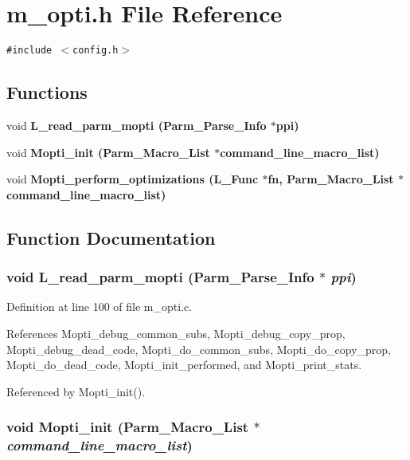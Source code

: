 \section{m\_\-opti.h File Reference}
\label{m__opti_8h}
{\tt \#include $<$config.h$>$}\par
\subsection*{Functions}
\begin{CompactItemize}
\item 
void \bf{L\_\-read\_\-parm\_\-mopti} (Parm\_\-Parse\_\-Info $\ast$ppi)
\item 
void \bf{Mopti\_\-init} (Parm\_\-Macro\_\-List $\ast$command\_\-line\_\-macro\_\-list)
\item 
void \bf{Mopti\_\-perform\_\-optimizations} (L\_\-Func $\ast$fn, Parm\_\-Macro\_\-List $\ast$command\_\-line\_\-macro\_\-list)
\end{CompactItemize}


\subsection{Function Documentation}
\subsubsection{\setlength{\rightskip}{0pt plus 5cm}void L\_\-read\_\-parm\_\-mopti (Parm\_\-Parse\_\-Info $\ast$ {\em ppi})}\label{m__opti_8h_c4127ccba417f74a6dda847e3908e13f}




Definition at line 100 of file m\_\-opti.c.

References Mopti\_\-debug\_\-common\_\-subs, Mopti\_\-debug\_\-copy\_\-prop, Mopti\_\-debug\_\-dead\_\-code, Mopti\_\-do\_\-common\_\-subs, Mopti\_\-do\_\-copy\_\-prop, Mopti\_\-do\_\-dead\_\-code, Mopti\_\-init\_\-performed, and Mopti\_\-print\_\-stats.

Referenced by Mopti\_\-init().
\subsubsection{\setlength{\rightskip}{0pt plus 5cm}void Mopti\_\-init (Parm\_\-Macro\_\-List $\ast$ {\em command\_\-line\_\-macro\_\-list})}\label{m__opti_8h_975d37e4997b7022bc1659fc5f6aaf79}




